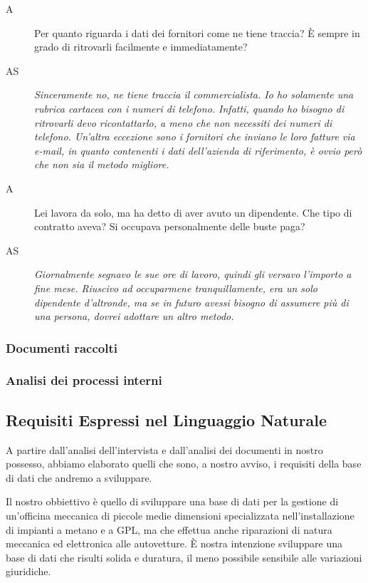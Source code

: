 \begin{description}
 			\item[A]
 				Per quanto riguarda i dati dei fornitori come ne tiene traccia? È sempre in grado di ritrovarli facilmente e immediatamente?
 			\item[AS]
 				\emph{Sinceramente no, ne tiene traccia il commercialista. Io ho solamente una rubrica cartacea con i numeri di telefono. Infatti, quando ho bisogno di ritrovarli devo ricontattarlo, a meno che non necessiti dei numeri di telefono. Un'altra eccezione sono i fornitori che inviano le loro fatture via e-mail, in quanto contenenti i dati dell'azienda di riferimento, è ovvio però che non sia il metodo migliore.}
 			\item[A]
 				Lei lavora da solo, ma ha detto di aver avuto un dipendente. Che tipo di contratto aveva? Si occupava personalmente delle buste paga?
 			\item[AS]
 				\emph{Giornalmente segnavo le sue ore di lavoro, quindi gli versavo l'importo a fine mese. Riuscivo ad occuparmene tranquillamente, era un solo dipendente d'altronde, ma se in futuro avessi bisogno di assumere più di una persona, dovrei adottare un altro metodo.}
 			
		\end{description}
				
		\subsubsection{Documenti raccolti}
		\subsubsection{Analisi dei processi interni}
		
	\subsection{Requisiti Espressi nel Linguaggio Naturale}
		A partire dall’analisi dell’intervista e dall’analisi dei documenti in nostro possesso, abbiamo elaborato quelli che sono, a nostro avviso, i requisiti della base di dati che andremo a sviluppare. 
		
		Il nostro obbiettivo è quello di sviluppare una base di dati per la gestione di un’officina meccanica di piccole medie dimensioni specializzata nell’installazione di impianti a metano e a GPL, ma che effettua anche riparazioni di natura meccanica ed elettronica alle autovetture. È nostra intenzione sviluppare una base di dati che risulti solida e duratura, il meno possibile sensibile alle variazioni giuridiche. 
		
